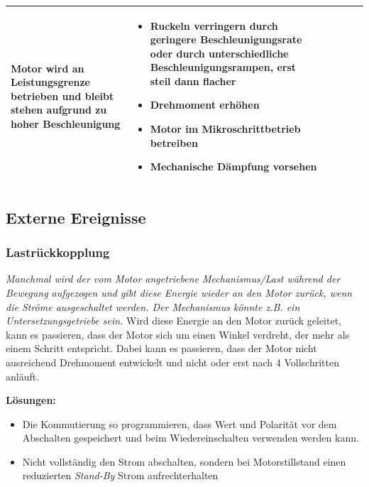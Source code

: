 {{{\begin{center}
\begin{tabularx}{\textwidth}{|X|X|X|X|X|X|}
					Motor wird an Leistungsgrenze betrieben und bleibt stehen aufgrund zu hoher Beschleunigung & 
					\begin{itemize} 
						\item {Ruckeln verringern durch geringere Beschleunigungsrate oder durch unterschiedliche Beschleunigungsrampen, erst steil dann flacher} 
						\item {Drehmoment erhöhen} 
						\item {Motor im Mikroschrittbetrieb betreiben} 
						\item {Mechanische Dämpfung vorsehen} 
					\end{itemize}	 \\	\hline
				\end{tabularx}
				\label{stehenderMotor}
			\end{center}
			
			
			
			\subsection{Externe Ereignisse}
			
			\subsubsection{Lastrückkopplung}
			
			\textit{\glqq Manchmal wird der vom Motor angetriebene Mechanismus/Last während der Bewegung \glqq aufgezogen \grqq und gibt diese Energie wieder an den Motor zurück, wenn die Ströme ausgeschaltet werden. Der Mechanismus könnte z.B. ein Untersetzungsgetriebe sein.\grqq}\cite{Faulhaber:2020} 
			Wird diese Energie an den Motor zurück geleitet, kann es passieren, dass der Motor sich um einen Winkel verdreht, der mehr als einem Schritt entspricht. Dabei kann es passieren, dass der Motor nicht ausreichend Drehmoment entwickelt und nicht oder erst nach 4 Vollschritten anläuft. \cite{Faulhaber:2020}
			
			\textbf{Lösungen:}
			\begin{itemize}
				\item Die Kommutierung so programmieren, dass Wert und Polarität vor dem Abschalten gespeichert und beim Wiedereinschalten verwenden werden kann. 
				\item Nicht vollständig den Strom abschalten, sondern bei Motorstillstand einen reduzierten \textit{Stand-By} Strom aufrechterhalten
			\end{itemize}
			
}}}

